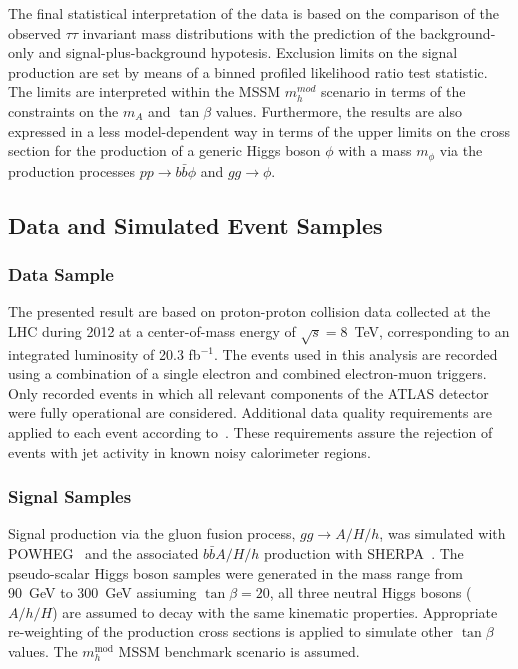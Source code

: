 The final statistical interpretation of the data is based on the 
comparison of the observed $\tau\tau$ invariant mass distributions with the prediction of the  background-only and signal-plus-background
hypotesis. Exclusion limits on the signal production are set by means of a binned profiled likelihood ratio
test statistic. The limits are interpreted  within the MSSM $m_{h}^{mod}$ scenario in terms of the constraints on the 
 $m_A$ and $\tan\beta$ values. Furthermore, the results are also expressed in a less model-dependent
way in terms of the upper limits on the cross section for the production of a generic Higgs boson $\phi$ with a  mass  $m_\phi$ 
via the production processes $pp \rightarrow b\bar{b}\phi$ and $gg \rightarrow \phi$.


 




\subsection{Data and Simulated Event Samples}
\label{sec:sample}
\subsubsection{Data Sample}

The  presented result  are based on proton-proton collision data
collected at the LHC during 2012 at a center-of-mass energy of $\sqrt{s}=8$~TeV,
corresponding to an integrated luminosity of 20.3 fb$^{-1}$.
The events used in this analysis are recorded using a combination of a
single electron and combined electron-muon triggers. Only recorded events 
in which all  relevant components of the ATLAS detector were
fully operational are considered.
Additional data quality requirements are applied to each event according to~\cite{ATLASCLEANING}.
These requirements assure the rejection of  events %
with jet activity in known noisy calorimeter regions. 




\subsubsection{Signal Samples}
Signal production via the gluon fusion process, $gg\rightarrow A/H/h$,
was simulated with POWHEG~\cite{POWHEG} and the associated
$b\bar{b}A/H/h$ production with SHERPA~\cite{SHERPA}.  The
pseudo-scalar Higgs boson samples were generated in the mass range from
90~GeV to 300~GeV assiuming $\tan\beta = 20$, all three  neutral Higgs bosons ($A/h/H$) are assumed to decay 
with the same kinematic properties. Appropriate re-weighting of the production cross sections is applied 
to simulate other $\tan\beta$ values. The $m_h^{\mathrm{mod}}$ MSSM benchmark scenario is assumed.


